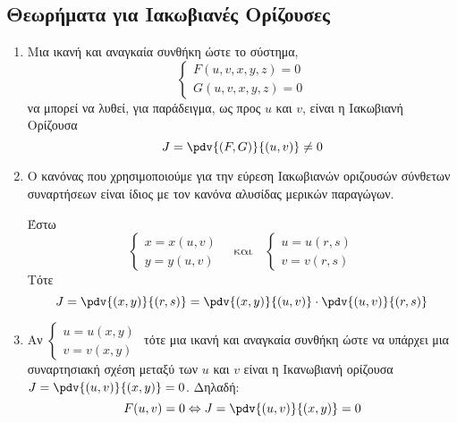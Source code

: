 \subsection{Θεωρήματα για Ιακωβιανές Ορίζουσες}

\begin{enumerate}
  \item Μια ικανή και αναγκαία συνθήκη ώστε το σύστημα, 
    \[
      \begin{cases}
        F(u,v,x,y,z) = 0 \\
        G(u,v,x,y,z) = 0
      \end{cases}
    \]
    να μπορεί να λυθεί, για παράδειγμα, ως προς 
    $u$ και $v$, είναι η Ιακωβιανή Ορίζουσα
    \[
      J = \pdv{(F,G)}{(u,v)} \neq 0 
    \] 

  \item Ο κανόνας που χρησιμοποιούμε για την εύρεση 
    Ιακωβιανών οριζουσών σύνθετων συναρτήσεων είναι 
    ίδιος με τον κανόνα αλυσίδας μερικών παραγώγων.

    Έστω 
    \[
      \begin{cases} x=x(u,v) \\
      y=y(u,v)\end{cases} \quad \text{και} \quad 
      \begin{cases} 
        u = u(r,s) \\
        v=v(r,s) 
      \end{cases} 
    \] 
    Τότε
    \[
      J = \pdv{(x,y)}{(r,s)} = \pdv{(x,y)}{(u,v)} \cdot \pdv{(u,v)}{(r,s)}  
    \] 
  \item Αν $ \begin{cases} u=u(x,y) \\ v=v(x,y) \end{cases} $ τότε μια ικανή 
    και αναγκαία συνθήκη ώστε να υπάρχει μια συναρτησιακή σχέση μεταξύ των 
    $ u $ και $v $ είναι η Ικανωβιανή ορίζουσα $ J = \pdv{(u,v)}{(x,y)} = 0 $.
    Δηλαδή:
    \[
      F(u,v)=0 \Leftrightarrow J = \pdv{(u,v)}{(x,y)} = 0 
    \] 
\end{enumerate}







